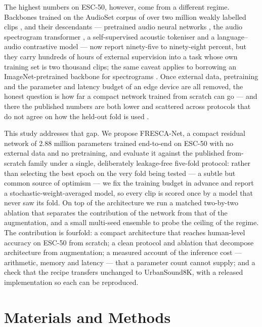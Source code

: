 \documentclass[conference]{IEEEtran}
\begin{document}
The highest numbers on ESC-50, however, come from a different regime. Backbones trained on the AudioSet corpus of over two million weakly labelled clips \cite{hershey_cnnaudio}, \cite{gemmeke_audioset} and their descendants --- pretrained audio neural networks \cite{kong_panns}, the audio spectrogram transformer \cite{gong_ast}, a self-supervised acoustic tokeniser \cite{chen_beats} and a language--audio contrastive model \cite{elizalde_clap} --- now report ninety-five to ninety-eight percent, but they carry hundreds of hours of external supervision into a task whose own training set is two thousand clips; the same caveat applies to borrowing an ImageNet-pretrained backbone for spectrograms \cite{guzhov_esresnet}. Once external data, pretraining and the parameter and latency budget of an edge device are all removed, the honest question is how far a compact network trained from scratch can go --- and there the published numbers are both lower and scattered across protocols that do not agree on how the held-out fold is used \cite{palanisamy_rethinking}.

This study addresses that gap. We propose FRESCA-Net, a compact residual network of 2.88 million parameters trained end-to-end on ESC-50 with no external data and no pretraining, and evaluate it against the published from-scratch family under a single, deliberately leakage-free five-fold protocol: rather than selecting the best epoch on the very fold being tested --- a subtle but common source of optimism --- we fix the training budget in advance and report a stochastic-weight-averaged model, so every clip is scored once by a model that never saw its fold. On top of the architecture we run a matched two-by-two ablation that separates the contribution of the network from that of the augmentation, and a small multi-seed ensemble to probe the ceiling of the regime. The contribution is fourfold: a compact architecture that reaches human-level accuracy on ESC-50 from scratch; a clean protocol and ablation that decompose architecture from augmentation; a measured account of the inference cost --- arithmetic, memory and latency --- that a parameter count cannot supply; and a check that the recipe transfers unchanged to UrbanSound8K, with a released implementation so each can be reproduced.

\section{Materials and Methods}
\end{document}
